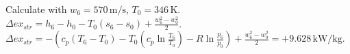 Calculate with \( w_6 = 570 \, \text{m/s} \), \( T_0 = 346 \, \text{K} \).  
\( \Delta ex_{str} = h_6 - h_0 - T_0 (s_6 - s_0) + \frac{w_6^2 - w_0^2}{2} \).  
\( \Delta ex_{str} = - (c_p (T_6 - T_0) - T_0 (c_p \ln \frac{T_6}{T_0}) - R \ln \frac{p_6}{p_0}) + \frac{w_6^2 - w_0^2}{2} = + 9.628 \, \text{kW/kg} \).